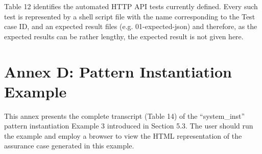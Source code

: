 \documentclass[12pt,twoside,a4paper]{article}
\begin{document}
Table 12 identifies the automated HTTP API tests currently defined. Every such test is represented by a shell script file with the name corresponding to the Test case ID, and an expected result files (e.g. 01-expected-json) and therefore, as the expected results can be rather lengthy, the expected result is not given here.

\clearpage
\hypertarget{annex-d-pattern-instantiation-example}{%
\section{Annex D: Pattern Instantiation Example}\label{annex-d-pattern-instantiation-example}}

This annex presents the complete transcript (Table 14) of the ``system\_inst'' pattern instantiation Example 3 introduced in Section 5.3. The user should run the example and employ a browser to view the HTML representation of the assurance case generated in this example.
\end{document}
